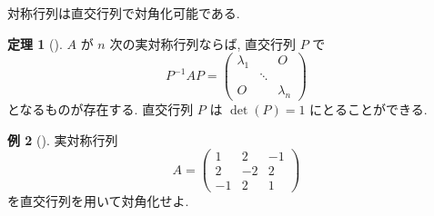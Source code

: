 \documentclass[dvipdfmx,a4paper,11pt]{article} %
\theoremstyle{definition}
\newtheorem{thm}{定理}[section]
\newtheorem{eg}[thm]{例}
\begin{document}

対称行列は直交行列で対角化可能である. 
\begin{thm}
[{\cite[定理6.3.3]{M}}]
\(A\) が \(n\) 次の実対称行列ならば, 直交行列 \(P\) で
\[
P^{-1}AP=
\begin{pmatrix}
\lambda_1&&O\\
&\ddots&\\
O&&\lambda_n
\end{pmatrix}
\]
となるものが存在する. 直交行列 \(P\) は
\(
\det(P)=1
\)
にとることができる.
\end{thm}

\begin{eg}
[{\cite[例題6.3.2]{M}}]
\label{ex-M-6.3.2}
実対称行列
\[
A=
\begin{pmatrix}
1&2&-1\\
2&-2&2\\
-1&2&1
\end{pmatrix}
\]
を直交行列を用いて対角化せよ.
\end{eg}
\end{document}
